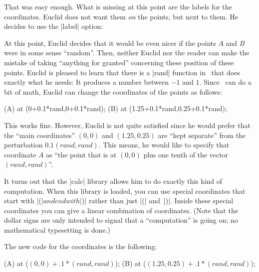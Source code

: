 That was easy enough. What is missing at this point are the labels for the
coordinates. Euclid does not want them \emph{on} the points, but next to them.
He decides to use the |label| option:
%
\begin{codeexample}[]
\end{codeexample}

At this point, Euclid decides that it would be even nicer if the points $A$ and
$B$ were in some sense ``random''. Then, neither Euclid nor the reader can make
the mistake of taking ``anything for granted'' concerning these position of
these points. Euclid is pleased to learn that there is a |rand| function in
\tikzname\ that does exactly what he needs: It produces a number between $-1$
and $1$. Since \tikzname\ can do a bit of math, Euclid can change the
coordinates of the points as follows:
%
\begin{codeexample}
\coordinate [...] (A) at (0+0.1*rand,0+0.1*rand);
\coordinate [...] (B) at (1.25+0.1*rand,0.25+0.1*rand);
\end{codeexample}

This works fine. However, Euclid is not quite satisfied since he would prefer
that the ``main coordinates'' $(0,0)$ and $(1.25,0.25)$ are ``kept separate''
from the perturbation $0.1(\mathit{rand},\mathit{rand})$. This means, he would
like to specify that coordinate $A$ as ``the point that is at $(0,0)$ plus one
tenth of the vector  $(\mathit{rand},\mathit{rand})$''.

It turns out that the |calc| library allows him to do exactly this kind of
computation. When this library is loaded, you can use special coordinates that
start with |($| and end with |$)| rather than just |(| and~|)|. Inside these
special coordinates you can give a linear combination of coordinates. (Note
that the dollar signs are only intended to signal that a ``computation'' is
going on; no mathematical typesetting is done.)

The new code for the coordinates is the following:
%
\begin{codeexample}
\coordinate [...] (A) at ($ (0,0) + .1*(rand,rand) $);
\coordinate [...] (B) at ($ (1.25,0.25) + .1*(rand,rand) $);
\end{codeexample}

